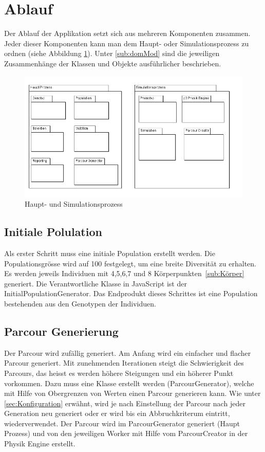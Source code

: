   \section{Ablauf\label{sec:Ablauf}}
    Der Ablauf der Applikation setzt sich aus mehreren Komponenten zusammen.
    Jeder dieser Komponenten kann man dem Haupt- oder Simulationsprozess zu ordnen (siehe Abbildung \ref{fig:hauptSimuProzesse}).
    Unter \ref{sub:domMod} sind die jeweiligen Zusammenhänge der Klassen und Objekte ausführlicher beschrieben.
    \begin{figure}[H]
      \includegraphics[scale=0.5]{graphics/haupt_simulations_prozess}
      \caption{Haupt- und Simulationsprozess}
      \label{fig:hauptSimuProzesse}
    \end{figure}
    \subsection{Initiale Polulation\label{sec:Initiale Polulation}}

      Als erster Schritt muss eine initiale Population erstellt werden. Die Populationsgrösse wird auf 100 festgelegt,
      um eine breite Diversität zu erhalten.
      Es werden jeweils Individuen mit 4,5,6,7 und 8 Körperpunkten~\ref{sub:Körper} generiert.
      Die Verantwortliche Klasse in JavaScript ist der InitialPopulationGenerator.
      Das Endprodukt dieses Schrittes ist eine Population bestehenden aus den Genotypen der Individuen.

    \subsection{Parcour Generierung\label{sec:Parcour Generierung}}

      Der Parcour wird zufällig generiert. Am Anfang wird ein einfacher und flacher Parcour generiert.
      Mit zunehmenden Iterationen steigt die Schwierigkeit des Parcours, das heisst es werden höhere Steigungen und ein höherer Punkt vorkommen.
      Dazu muss eine Klasse erstellt werden (ParcourGenerator), welche mit Hilfe von Obergrenzen von Werten einen Parcour generieren kann.
      Wie unter \ref{sec:Konfiguration} erwähnt, wird je nach Einstellung der Parcour nach jeder Generation neu generiert oder er wird bis ein Abbruchkriterum
      eintritt, wiederverwendet. Der Parcour wird im ParcourGenerator generiert (Haupt Prozess) und von den jeweiligen Worker mit Hilfe vom ParcourCreator in der Physik Engine erstellt.

